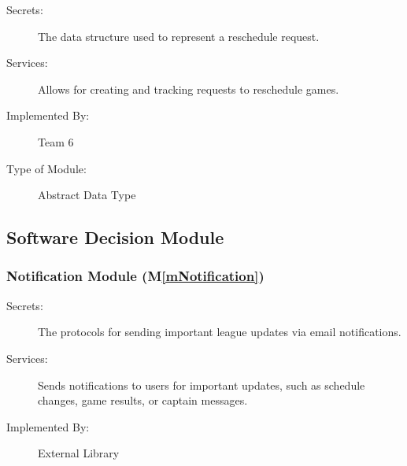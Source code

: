 \documentclass[12pt, titlepage]{article}
\newcommand{\mref}[1]{M\ref{#1}}
\begin{document}
\begin{description}
  \item[Secrets:] The data structure used to represent a reschedule request.
  \item[Services:] Allows for creating and tracking requests to reschedule games.
  \item[Implemented By:] Team 6
  \item[Type of Module:] Abstract Data Type
\end{description}


\subsection{Software Decision Module}


\subsubsection{Notification Module (\mref{mNotification})}
\begin{description}
  \item[Secrets:] The protocols for sending important league updates via email notifications.
  \item[Services:] Sends notifications to users for important updates, such as schedule changes, game results, or captain messages.
  \item[Implemented By:] External Library
\end{description}
\end{document}
